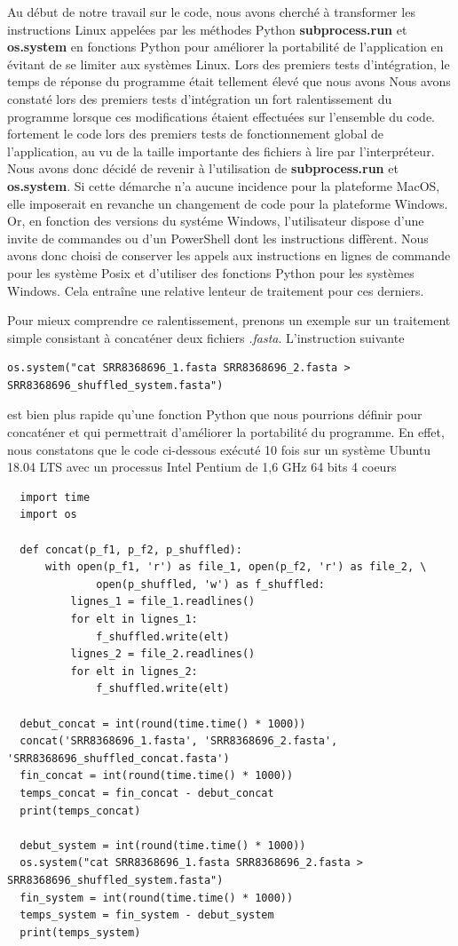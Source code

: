 \documentclass[twoside,a4paper,11pt,frenchb,openany]{report}
\begin{document}
Au début de notre travail sur le code, nous avons cherché à transformer les instructions Linux appelées par les méthodes Python \textbf{subprocess.run} et \textbf{os.system} en fonctions Python pour améliorer la portabilité de l'application en évitant de se limiter aux systèmes Linux. Lors des premiers tests d'intégration, le temps de réponse du programme était tellement élevé que nous avons Nous avons constaté lors des premiers tests d'intégration un fort ralentissement du programme lorsque ces modifications étaient effectuées sur l'ensemble du code. fortement le code lors des premiers tests de fonctionnement global de l'application, au vu de la taille importante des fichiers à lire par l'interpréteur. Nous avons donc décidé de revenir à l'utilisation de \textbf{subprocess.run} et \textbf{os.system}. Si cette démarche n'a aucune incidence pour la plateforme MacOS, elle imposerait en revanche un changement de code pour la plateforme Windows. Or, en fonction des versions du systéme Windows, l'utilisateur dispose d'une invite de commandes ou d'un PowerShell dont les instructions diffèrent. Nous avons donc choisi de conserver les appels aux instructions en lignes de commande pour les système Posix et d'utiliser des fonctions Python pour les systèmes Windows. Cela entraîne une relative lenteur de traitement pour ces derniers. 

Pour mieux comprendre ce ralentissement, prenons un exemple sur un traitement simple consistant à concaténer deux fichiers \textit{.fasta}. L'instruction suivante

\begin{verbatim}os.system("cat SRR8368696_1.fasta SRR8368696_2.fasta > SRR8368696_shuffled_system.fasta")\end{verbatim}

est bien plus rapide qu'une fonction Python que nous pourrions définir pour concaténer et qui permettrait d'améliorer la portabilité du programme. En effet, nous constatons que le code ci-dessous exécuté 10 fois sur un système Ubuntu 18.04 LTS avec un processus Intel Pentium de 1,6 GHz 64 bits 4 coeurs

\begin{verbatim}
  import time
  import os

  def concat(p_f1, p_f2, p_shuffled):
      with open(p_f1, 'r') as file_1, open(p_f2, 'r') as file_2, \
              open(p_shuffled, 'w') as f_shuffled:
          lignes_1 = file_1.readlines()
          for elt in lignes_1:
              f_shuffled.write(elt)
          lignes_2 = file_2.readlines()
          for elt in lignes_2:
              f_shuffled.write(elt)

  debut_concat = int(round(time.time() * 1000))
  concat('SRR8368696_1.fasta', 'SRR8368696_2.fasta', 'SRR8368696_shuffled_concat.fasta')
  fin_concat = int(round(time.time() * 1000))
  temps_concat = fin_concat - debut_concat
  print(temps_concat)

  debut_system = int(round(time.time() * 1000))
  os.system("cat SRR8368696_1.fasta SRR8368696_2.fasta > SRR8368696_shuffled_system.fasta")
  fin_system = int(round(time.time() * 1000))
  temps_system = fin_system - debut_system
  print(temps_system)
\end{verbatim}
\end{document}
